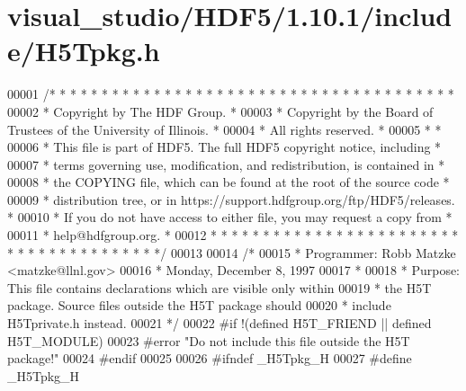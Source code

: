\hypertarget{visual__studio_2_h_d_f5_21_810_81_2include_2_h5_tpkg_8h_source}{}\section{visual\+\_\+studio/\+H\+D\+F5/1.10.1/include/\+H5\+Tpkg.h}
\label{visual__studio_2_h_d_f5_21_810_81_2include_2_h5_tpkg_8h_source}

\begin{DoxyCode}
00001 \textcolor{comment}{/* * * * * * * * * * * * * * * * * * * * * * * * * * * * * * * * * * * * * * *}
00002 \textcolor{comment}{ * Copyright by The HDF Group.                                               *}
00003 \textcolor{comment}{ * Copyright by the Board of Trustees of the University of Illinois.         *}
00004 \textcolor{comment}{ * All rights reserved.                                                      *}
00005 \textcolor{comment}{ *                                                                           *}
00006 \textcolor{comment}{ * This file is part of HDF5.  The full HDF5 copyright notice, including     *}
00007 \textcolor{comment}{ * terms governing use, modification, and redistribution, is contained in    *}
00008 \textcolor{comment}{ * the COPYING file, which can be found at the root of the source code       *}
00009 \textcolor{comment}{ * distribution tree, or in https://support.hdfgroup.org/ftp/HDF5/releases.  *}
00010 \textcolor{comment}{ * If you do not have access to either file, you may request a copy from     *}
00011 \textcolor{comment}{ * help@hdfgroup.org.                                                        *}
00012 \textcolor{comment}{ * * * * * * * * * * * * * * * * * * * * * * * * * * * * * * * * * * * * * * */}
00013 
00014 \textcolor{comment}{/*}
00015 \textcolor{comment}{ * Programmer:  Robb Matzke <matzke@llnl.gov>}
00016 \textcolor{comment}{ *      Monday, December  8, 1997}
00017 \textcolor{comment}{ *}
00018 \textcolor{comment}{ * Purpose: This file contains declarations which are visible only within}
00019 \textcolor{comment}{ *      the H5T package.  Source files outside the H5T package should}
00020 \textcolor{comment}{ *      include H5Tprivate.h instead.}
00021 \textcolor{comment}{ */}
00022 \textcolor{preprocessor}{#if !(defined H5T\_FRIEND || defined H5T\_MODULE)}
00023 \textcolor{preprocessor}{#error "Do not include this file outside the H5T package!"}
00024 \textcolor{preprocessor}{#endif}
00025 
00026 \textcolor{preprocessor}{#ifndef \_H5Tpkg\_H}
00027 \textcolor{preprocessor}{#define \_H5Tpkg\_H}

\end{DoxyCode}

